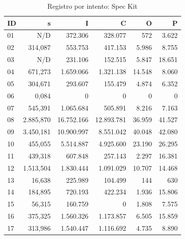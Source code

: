 \begin{table}[H]\centering\small\setlength{\tabcolsep}{4pt}\renewcommand{\arraystretch}{1.06}
\caption{Registro por intento: Spec Kit}
\label{tab:sesiones_speckit_tetris_e2}
\begin{tabular*}{\textwidth}{@{\extracolsep{\fill}}l r r r r r}\toprule

\textbf{ID} & \textbf{s} & \textbf{I} & \textbf{C} & \textbf{O} & \textbf{P} \\ \midrule

01 & N/D & 372.306 & 328.077 & 572 & 3.622 \\

02 & 314,087 & 553.753 & 417.153 & 5.986 & 8.755 \\

03 & N/D & 231.106 & 152.515 & 5.847 & 18.651 \\

04 & 671,273 & 1.659.066 & 1.321.138 & 14.548 & 8.060 \\

05 & 304,671 & 293.607 & 155.479 & 4.874 & 6.352 \\

06 & 0,084 & 0 & 0 & 0 & 0 \\

07 & 545,391 & 1.065.684 & 505.891 & 8.216 & 7.163 \\

08 & 2.885,870 & 16.752.166 & 12.893.781 & 36.959 & 41.527 \\

09 & 3.450,181 & 10.900.997 & 8.551.042 & 40.048 & 42.080 \\

10 & 455,055 & 5.514.887 & 4.925.600 & 23.190 & 26.295 \\

11 & 439,318 & 607.848 & 257.143 & 2.297 & 16.381 \\

12 & 1.513,504 & 1.830.444 & 1.091.029 & 10.707 & 14.468 \\

13 & 16,638 & 225.989 & 104.499 & 144 & 630 \\

14 & 184,895 & 720.193 & 422.234 & 1.936 & 15.806 \\

15 & 56,315 & 160.759 & 0 & 1.808 & 7.575 \\

16 & 375,325 & 1.560.326 & 1.173.857 & 6.505 & 15.859 \\

17 & 313,986 & 1.540.447 & 1.116.692 & 4.735 & 8.890 \\

\bottomrule\end{tabular*}

\end{table}

